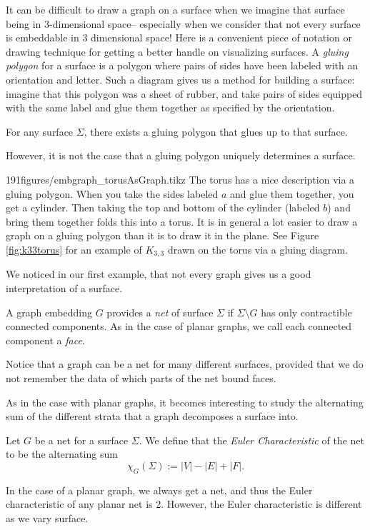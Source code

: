 It can be difficult to draw a graph on a surface when we imagine that surface being in 3-dimensional space-- especially when we consider that not every surface is embeddable in 3 dimensional space! Here is a convenient piece of notation or drawing technique for getting a better handle on visualizing surfaces. A \emph{gluing polygon} for a surface is a polygon where pairs of sides have been labeled with an orientation and letter. Such a diagram gives us a method for building a surface: imagine that this polygon was a sheet of rubber, and take pairs of sides equipped with the same label and glue them together as specified by the orientation. 
\begin{claim}
For any surface $\Sigma$, there exists a gluing polygon that glues up to that surface. 
\end{claim}
However, it is not the case that a gluing polygon uniquely determines a surface. 


\begin{examplefigureenv}{191figures/embgraph_torusAsGraph.tikz}
	The torus has a nice description via a gluing polygon. When you take the sides labeled $a$ and glue them together, you get a cylinder. Then taking the top and bottom of the cylinder (labeled $b$) and bring them together folds this into a torus. 
It is in general a lot easier to draw a graph on a gluing polygon than it is to draw it in the plane. See Figure \ref{fig:k33torus} for an example of $K_{3,3}$ drawn on the torus via a gluing diagram. 

\label{fig:k33torus}
\end{examplefigureenv}

We  noticed in our first example, that not every graph gives us a good interpretation of a surface.  
\begin{definition}
A graph embedding $G$ provides a \emph{net} of surface $\Sigma$ if $\Sigma\setminus G$ has only contractible connected components. As in the case of planar graphs, we call each connected component a \emph{face}. 
\end{definition}
Notice that a graph can be a net for many different surfaces, provided that we do not remember the data of which parts of the net bound faces.  

As in the case with planar graphs, it becomes interesting to study the alternating sum of the different strata that a graph decomposes a surface into. 
\begin{definition}
Let $G$ be a net for a surface $\Sigma$. We define that the \emph{Euler Characteristic} of the net to be the alternating sum
\[\chi_G(\Sigma):= |V|-|E|+|F|.\]
\end{definition}
In the case of a planar graph, we always get a net, and thus the Euler characteristic of any planar net is 2. However, the Euler characteristic is different as we vary surface. 

